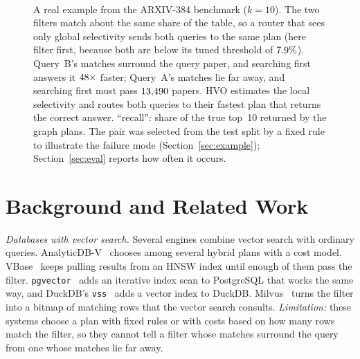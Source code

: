 \documentclass[sigconf,nonacm]{acmart}
\newcommand{\Ppre}{\Pi_{\text{pre}}}
\newcommand{\Pfus}{\Pi_{\text{fused}}}
\newcommand{\Ppost}{\Pi_{\text{post}}}
\begin{document}
\begin{figure}[!t]
\begin{minipage}[t]{0.485\textwidth}
\\[2pt]
\end{minipage}
\caption{A real example from the ARXIV-384 benchmark ($k=10$). The two filters match about the same share of the table, so a router that sees only global selectivity sends both queries to the same plan (here filter first, because both are below its tuned threshold of $7.9\%$). Query~B's matches surround the query paper, and searching first answers it $48\times$ faster; Query~A's matches lie far away, and searching first must pass $13{,}490$ papers. HVO estimates the local selectivity and routes both queries to their fastest plan that returns the correct answer. ``recall'': share of the true top~10 returned by the graph plans. The pair was selected from the test split by a fixed rule to illustrate the failure mode (Section~\ref{sec:example}); Section~\ref{sec:eval} reports how often it occurs.}
\label{fig:example}
\end{figure}

\section{Background and Related Work}\label{sec:related}
\emph{Databases with vector search.} Several engines combine vector search with ordinary queries. AnalyticDB-V~\cite{wei2020analyticdbv} chooses among several hybrid plans with a cost model. VBase~\cite{zhang2023vbase} keeps pulling results from an HNSW index until enough of them pass the filter. \texttt{pgvector}~\cite{pgvector2024} adds an iterative index scan to PostgreSQL that works the same way, and DuckDB's \texttt{vss}~\cite{duckdbvss2024} adds a vector index to DuckDB. Milvus~\cite{wang2021milvus} turns the filter into a bitmap of matching rows that the vector search consults. \emph{Limitation:} these systems choose a plan with fixed rules or with costs based on how many rows match the filter, so they cannot tell a filter whose matches surround the query from one whose matches lie far away.
\end{document}
